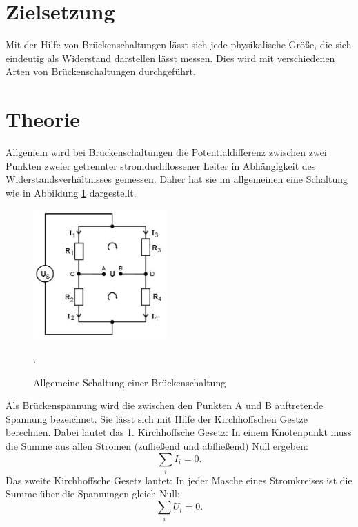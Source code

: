 \section{Zielsetzung}
Mit der Hilfe von Brückenschaltungen lässt sich jede physikalische Größe, die sich
eindeutig als Widerstand darstellen lässt messen.
Dies wird mit verschiedenen Arten von Brückenschaltungen durchgeführt.

\section{Theorie}
Allgemein wird bei Brückenschaltungen die Potentialdifferenz zwischen zwei
Punkten zweier getrennter stromduchflossener Leiter in Abhängigkeit des
Widerstandsverhältnisses gemessen. Daher hat sie im allgemeinen eine Schaltung wie in
Abbildung \ref{fig:allg} dargestellt.
\begin{figure}[H]
  \centering
  \includegraphics[height=5cm]{allg.JPG}
  \caption{Allgemeine Schaltung einer Brückenschaltung}
  \label{fig:allg}
  \cite{skript}.
\end{figure}
\noindent Als Brückenspannung wird die zwischen den Punkten A und B auftretende Spannung
bezeichnet. Sie lässt sich mit Hilfe der Kirchhoffschen Gestze berechnen.
Dabei lautet das 1. Kirchhoffsche Gesetz: In einem Knotenpunkt muss die
Summe aus allen Strömen (zufließend und abfließend) Null ergeben:
\begin{equation}
  \sum_{i} I_{i} = 0.
  \label{eqn:kirch1}
\end{equation}
Das zweite Kirchhoffsche Gesetz lautet: In jeder Masche eines Stromkreises
ist die Summe über die Spannungen gleich Null:
\begin{equation}
  \sum_{i} U_{i} =0.
  \label{eqn:kirch2}
\end{equation}

